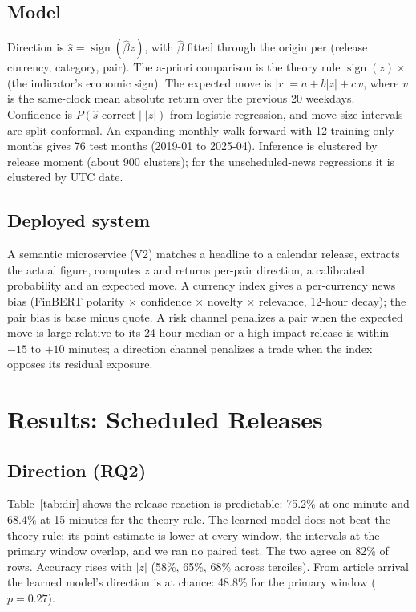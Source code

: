 \documentclass[conference]{IEEEtran}
\begin{document}
\subsection{Model}
Direction is $\hat s=\operatorname{sign}(\hat\beta z)$, with $\hat\beta$ fitted through the origin
per (release currency, category, pair). The a-priori comparison is the theory rule
$\operatorname{sign}(z)\times$ (the indicator's economic sign). The expected move is
$|r|=a+b|z|+c\,v$, where $v$ is the same-clock mean absolute return over the previous 20
weekdays. Confidence is $P(\hat s\text{ correct}\mid|z|)$ from logistic regression, and
move-size intervals are split-conformal. An expanding monthly walk-forward with 12 training-only
months gives 76 test months (2019-01 to 2025-04). Inference is clustered by release moment
(about 900 clusters); for the unscheduled-news regressions it is clustered by UTC date.

\subsection{Deployed system}
A semantic microservice (V2) matches a headline to a calendar release, extracts the actual
figure, computes $z$ and returns per-pair direction, a calibrated probability and an expected move.
A currency index gives a per-currency news bias (FinBERT polarity $\times$ confidence $\times$
novelty $\times$ relevance, 12-hour decay); the pair bias is base minus quote. A risk channel
penalizes a pair when the expected move is large relative to its 24-hour median or a high-impact
release is within $-15$ to $+10$ minutes; a direction channel penalizes a trade when the index
opposes its residual exposure.

\section{Results: Scheduled Releases}\label{sec:sched}

\subsection{Direction (RQ2)}
Table~\ref{tab:dir} shows the release reaction is predictable: 75.2\% at one minute and 68.4\% at
15 minutes for the theory rule. The learned model does not beat the theory rule: its point
estimate is lower at every window, the intervals at the primary window overlap, and we ran no
paired test. The two agree on 82\% of rows. Accuracy rises with $|z|$ (58\%, 65\%, 68\% across
terciles). From article arrival the learned model's direction is at chance: 48.8\% for the
primary window ($p=0.27$).
\end{document}
